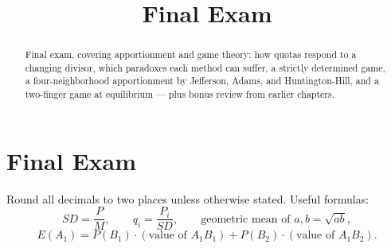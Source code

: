 \documentclass[12pt]{ximera}
\title{Final Exam}
\begin{document}
\begin{abstract}
Final exam, covering apportionment and game theory: how quotas respond to a changing
divisor, which paradoxes each method can suffer, a strictly determined game, a
four-neighborhood apportionment by Jefferson, Adams, and Huntington-Hill, and a
two-finger game at equilibrium --- plus bonus review from earlier chapters.
\end{abstract}
\maketitle

\section*{Final Exam}

Round all decimals to two places unless otherwise stated. Useful formulas:
\[
SD=\frac{P}{M}, \qquad q_i=\frac{P_i}{SD}, \qquad \text{geometric mean of } a,b=\sqrt{ab},
\]
\[
E(A_1)=P(B_1)\cdot(\text{value of }A_1B_1)+P(B_2)\cdot(\text{value of }A_1B_2).
\]
\end{document}
